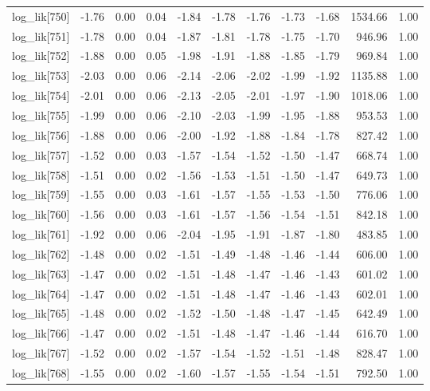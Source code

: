 \begin{table}[ht]
\begin{tabular}{rrrrrrrrrrr}
  log\_lik[750] & -1.76 & 0.00 & 0.04 & -1.84 & -1.78 & -1.76 & -1.73 & -1.68 & 1534.66 & 1.00 \\ 
  log\_lik[751] & -1.78 & 0.00 & 0.04 & -1.87 & -1.81 & -1.78 & -1.75 & -1.70 & 946.96 & 1.00 \\ 
  log\_lik[752] & -1.88 & 0.00 & 0.05 & -1.98 & -1.91 & -1.88 & -1.85 & -1.79 & 969.84 & 1.00 \\ 
  log\_lik[753] & -2.03 & 0.00 & 0.06 & -2.14 & -2.06 & -2.02 & -1.99 & -1.92 & 1135.88 & 1.00 \\ 
  log\_lik[754] & -2.01 & 0.00 & 0.06 & -2.13 & -2.05 & -2.01 & -1.97 & -1.90 & 1018.06 & 1.00 \\ 
  log\_lik[755] & -1.99 & 0.00 & 0.06 & -2.10 & -2.03 & -1.99 & -1.95 & -1.88 & 953.53 & 1.00 \\ 
  log\_lik[756] & -1.88 & 0.00 & 0.06 & -2.00 & -1.92 & -1.88 & -1.84 & -1.78 & 827.42 & 1.00 \\ 
  log\_lik[757] & -1.52 & 0.00 & 0.03 & -1.57 & -1.54 & -1.52 & -1.50 & -1.47 & 668.74 & 1.00 \\ 
  log\_lik[758] & -1.51 & 0.00 & 0.02 & -1.56 & -1.53 & -1.51 & -1.50 & -1.47 & 649.73 & 1.00 \\ 
  log\_lik[759] & -1.55 & 0.00 & 0.03 & -1.61 & -1.57 & -1.55 & -1.53 & -1.50 & 776.06 & 1.00 \\ 
  log\_lik[760] & -1.56 & 0.00 & 0.03 & -1.61 & -1.57 & -1.56 & -1.54 & -1.51 & 842.18 & 1.00 \\ 
  log\_lik[761] & -1.92 & 0.00 & 0.06 & -2.04 & -1.95 & -1.91 & -1.87 & -1.80 & 483.85 & 1.00 \\ 
  log\_lik[762] & -1.48 & 0.00 & 0.02 & -1.51 & -1.49 & -1.48 & -1.46 & -1.44 & 606.00 & 1.00 \\ 
  log\_lik[763] & -1.47 & 0.00 & 0.02 & -1.51 & -1.48 & -1.47 & -1.46 & -1.43 & 601.02 & 1.00 \\ 
  log\_lik[764] & -1.47 & 0.00 & 0.02 & -1.51 & -1.48 & -1.47 & -1.46 & -1.43 & 602.01 & 1.00 \\ 
  log\_lik[765] & -1.48 & 0.00 & 0.02 & -1.52 & -1.50 & -1.48 & -1.47 & -1.45 & 642.49 & 1.00 \\ 
  log\_lik[766] & -1.47 & 0.00 & 0.02 & -1.51 & -1.48 & -1.47 & -1.46 & -1.44 & 616.70 & 1.00 \\ 
  log\_lik[767] & -1.52 & 0.00 & 0.02 & -1.57 & -1.54 & -1.52 & -1.51 & -1.48 & 828.47 & 1.00 \\ 
  log\_lik[768] & -1.55 & 0.00 & 0.02 & -1.60 & -1.57 & -1.55 & -1.54 & -1.51 & 792.50 & 1.00 \\ 

\end{tabular}
\end{table}
